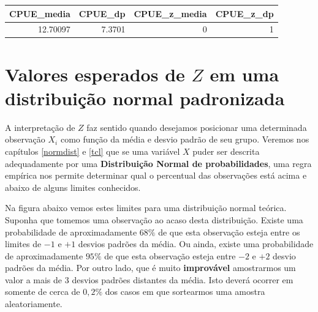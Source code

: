 \documentclass[
]{book}
\begin{document}
\begin{tabular}{r|r|r|r}
\hline
CPUE\_media & CPUE\_dp & CPUE\_z\_media & CPUE\_z\_dp\\
\hline
12.70097 & 7.3701 & 0 & 1\\
\hline
\end{tabular}

\hypertarget{valores-esperados-de-z-em-uma-distribuiuxe7uxe3o-normal-padronizada}{%
\section{\texorpdfstring{Valores esperados de \(Z\) em uma distribuição normal padronizada}{Valores esperados de Z em uma distribuição normal padronizada}}\label{valores-esperados-de-z-em-uma-distribuiuxe7uxe3o-normal-padronizada}}

A interpretação de \(Z\) faz sentido quando desejamos posicionar uma determinada observação \(X_i\) como função da média e desvio padrão de seu grupo. Veremos nos capítulos \ref{normdist} e \ref{tcl} que se uma variável \(X\) puder ser descrita adequadamente por uma \textbf{Distribuição Normal de probabilidades}, uma regra empírica nos permite determinar qual o percentual das observações está acima e abaixo de alguns limites conhecidos.

Na figura abaixo vemos estes limites para uma distribuição normal teórica. Suponha que tomemos uma observação ao acaso desta distribuição. Existe uma probabilidade de aproximadamente \(68\%\) de que esta observação esteja entre os limites de \(-1\) e \(+1\) desvios padrões da média. Ou ainda, existe uma probabilidade de aproximadamente \(95\%\) de que esta observação esteja entre \(-2\) e \(+2\) desvio padrões da média. Por outro lado, que é muito \textbf{improvável} amostrarmos um valor a mais de \(3\) desvios padrões distantes da média. Isto deverá ocorrer em somente de cerca de \(0,2\%\) dos casos em que sortearmos uma amostra aleatoriamente.
\end{document}
